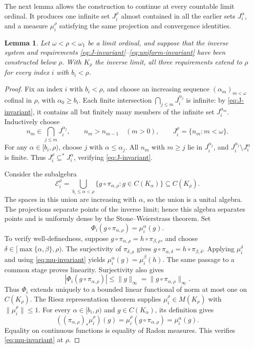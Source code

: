 \documentclass[a4paper,11pt]{amsart}
\theoremstyle{plain}
\newtheorem{lemma}[theorem]{Lemma}
\theoremstyle{definition}
\theoremstyle{remark}
\numberwithin{equation}{section}
\begin{document}
The next lemma allows the construction to continue at every countable limit ordinal.  It produces one infinite set $J_i^\rho$ almost contained in all the earlier sets $J_i^\alpha$, and a measure $\mu_i^\rho$ satisfying the same projection and convergence identities.

\begin{lemma}\label{lem:limit-invariant}
Let $\omega<\rho<\omega_1$ be a limit ordinal, and suppose that the inverse system and requirements \eqref{eq:J-invariant}--\eqref{eq:uniform-invariant} have been constructed below $\rho$.  With $K_\rho$ the inverse limit, all three requirements extend to $\rho$ for every index $i$ with $b_i<\rho$.
\end{lemma}
\begin{proof}
Fix an index $i$ with $b_i<\rho$, and choose an increasing sequence $(\alpha_m)_{m<\omega}$ cofinal in $\rho$, with $\alpha_0\geqslant b_i$.  Each finite intersection $\bigcap_{j\leqslant m}J_i^{\alpha_j}$ is infinite: by \eqref{eq:J-invariant}, it contains all but finitely many members of the infinite set $J_i^{\alpha_m}$.  Inductively choose
\[
 n_m\in\bigcap_{j\leqslant m}J_i^{\alpha_j},
 \qquad n_m>n_{m-1}\quad(m>0),
 \qquad J_i^\rho=\{n_m:m<\omega\}.
\]
For any $\alpha\in[b_i,\rho)$, choose $j$ with $\alpha\leqslant\alpha_j$.  All $n_m$ with $m\geqslant j$ lie in $J_i^{\alpha_j}$, and $J_i^{\alpha_j}\setminus J_i^\alpha$ is finite.  Thus $J_i^\rho\subseteq^*J_i^\alpha$, verifying \eqref{eq:J-invariant}.

Consider the subalgebra
\[
 \mathcal E_i^\rho=
 \bigcup_{b_i\leqslant\alpha<\rho}
 \{g\circ\pi_{\alpha,\rho}:g\in C(K_\alpha)\}
 \subseteq C(K_\rho).
\]
The spaces in this union are increasing with $\alpha$, so the union is a unital algebra.  The projections separate points of the inverse limit; hence this algebra separates points and is uniformly dense by the Stone--Weierstrass theorem.  Set
\[
 \Phi_i(g\circ\pi_{\alpha,\rho})=\mu_i^\alpha(g).
\]
To verify well-definedness, suppose
$g\circ\pi_{\alpha,\rho}=h\circ\pi_{\beta,\rho}$, and choose $\delta\in[\max\{\alpha,\beta\},\rho)$.  The surjectivity of $\pi_{\delta,\rho}$ gives
$g\circ\pi_{\alpha,\delta}=h\circ\pi_{\beta,\delta}$.  Applying $\mu_i^\delta$ and using \eqref{eq:mu-invariant} yields $\mu_i^\alpha(g)=\mu_i^\beta(h)$.  The same passage to a common stage proves linearity.  Surjectivity also gives
\[
 |\Phi_i(g\circ\pi_{\alpha,\rho})|
 \leqslant\|g\|_\infty
 =\|g\circ\pi_{\alpha,\rho}\|_\infty.
\]
Thus $\Phi_i$ extends uniquely to a bounded linear functional of norm at most one on $C(K_\rho)$.  The Riesz representation theorem supplies $\mu_i^\rho\in M(K_\rho)$ with $\|\mu_i^\rho\|\leqslant1$.  For every $\alpha\in[b_i,\rho)$ and $g\in C(K_\alpha)$, its definition gives
\[
 ((\pi_{\alpha,\rho})_*\mu_i^\rho)(g)
 =\mu_i^\rho(g\circ\pi_{\alpha,\rho})
 =\mu_i^\alpha(g).
\]
Equality on continuous functions is equality of Radon measures.  This verifies \eqref{eq:mu-invariant} at $\rho$.


\end{proof}
\end{document}
